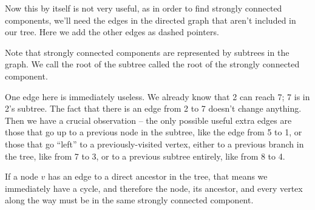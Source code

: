 \begin{center}
\end{center}

Now this by itself is not very useful, as in order to find strongly connected components, we'll need the edges in the directed graph that aren't included in our tree. Here we add the other edges as dashed pointers.

\begin{center}
\end{center}

Note that strongly connected components are represented by subtrees in the graph. We call the root of the subtree called the root of the strongly connected component.

One edge here is immediately useless. We already know that 2 can reach 7; 7 is in 2's subtree. The fact that there is an edge from 2 to 7 doesn't change anything. Then we have a crucial observation -- the only possible useful extra edges are those that go up to a previous node in the subtree, like the edge from 5 to 1, or those that go ``left'' to a previously-visited vertex, either to a previous branch in the tree, like from 7 to 3, or to a previous subtree entirely, like from 8 to 4.

If a node $v$ has an edge to a direct ancestor in the tree, that means we immediately have a cycle, and therefore the node, its ancestor, and every vertex along the way must be in the same strongly connected component.


